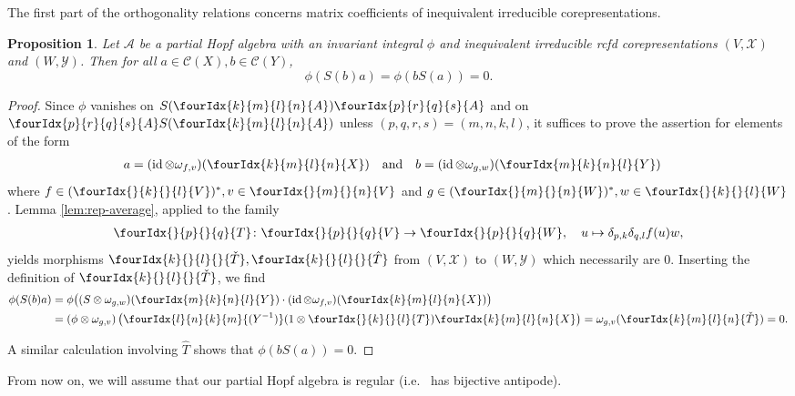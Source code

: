 \documentclass[10pt]{article}
\DeclareMathOperator{\id}{id}
\newcommand{\dual}[1]{#1^{*}}
\newcommand{\Gr}[5]{\fourIdx{#2}{#4}{#3}{#5}{#1}}%
\newcommand{\Gru}[3]{\Gr{#1}{}{}{#2}{#3}}
\newcommand{\Grd}[3]{\Gr{#1}{#2}{#3}{}{}}
\newtheorem{Prop}[Theorem]{Proposition}
\theoremstyle{definition}
\numberwithin{equation}{section}
\begin{document}
The first part of the orthogonality relations concerns matrix
coefficients of inequivalent irreducible corepresentations. 
\begin{Prop} \label{prop:rep-orthogonality-1} Let $\mathcal{A}$ be a
  partial Hopf algebra with an invariant integral $\phi$ and inequivalent
  irreducible rcfd corepresentations $(V,\mathscr{X})$ and
  $(W,\mathscr{Y})$.  Then  for all
  $a\in \mathcal{C}(X), b \in \mathcal{C}(Y)$,
  \[\phi(S(b)a) = \phi(bS(a))=0.\]
\end{Prop}
\begin{proof}
Since $\phi$ vanishes on $S(\Gr{A}{k}{l}{m}{n})\Gr{A}{p}{q}{r}{s}$ and
on $\Gr{A}{p}{q}{r}{s}S(\Gr{A}{k}{l}{m}{n})$ unless
$(p,q,r,s) = (m,n,k,l)$, it suffices to prove the assertion for  elements of the form
\begin{align*}
  a&=(\id \otimes \omega_{f,v})(\Gr{X}{k}{l}{m}{n})  && \text{and} &
  b&=(\id \otimes \omega_{g,w})(\Gr{Y}{m}{n}{k}{l})
\end{align*}
where $f\in \dual{(\Gru{V}{k}{l})}, v \in \Gru{V}{m}{n}$ and $g \in
\dual{(\Gru{W}{m}{n})}, w \in \Gru{W}{k}{l}$.  Lemma
\ref{lem:rep-average}, applied to the family
  \begin{align*}
    \Gru{T}{p}{q} \colon \Gru{V}{p}{q} \to \Gru{W}{p}{q}, \quad u
    \mapsto  \delta_{p,k}\delta_{q,l}  f(u)w,
  \end{align*}
  yields morphisms $\Grd{\check{T}}{k}{l},\Grd{\hat{T}}{k}{l}$ from $(V,\mathscr{X})$ to
  $(W,\mathscr{Y})$ which necessarily are $0$. Inserting the
  definition of $\Grd{\check{T}}{k}{l}$, we find
  \begin{align*}
    \phi(S(b)a) &= \phi\big((S \otimes
    \omega_{g,w})(\Gr{Y}{m}{n}{k}{l}) \cdot (\id \otimes
    \omega_{f,v})(\Gr{X}{k}{l}{m}{n})\big) \\ &= (\phi \otimes \omega_{g,v})\left(\Gr{(Y^{-1})}{l}{k}{n}{m}(1 \otimes
      \Gru{T}{k}{l} )     \Gr{X}{k}{l}{m}{n}\right) 
    = \omega_{g,v}( \Gr{\check{T}}{k}{l}{m}{n}) = 0.
  \end{align*}
  
  A similar calculation involving $\hat{T}$ shows that
  $\phi(bS(a))=0$.  
\end{proof}

From now on, we will assume that our partial Hopf algebra is regular (i.e.~ has bijective antipode).
\end{document}

